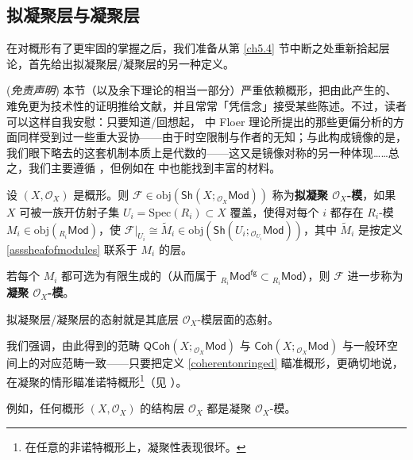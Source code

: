\subsection{拟凝聚层与凝聚层}\label{ch5.6}


在对概形有了更牢固的掌握之后，我们准备从第 \ref{ch5.4} 节中断之处重新拾起层论，首先给出拟凝聚层/凝聚层的另一种定义。

\begin{Rem}\label{disclaimer}(\textit{免责声明})
本节（以及余下理论的相当一部分）严重依赖概形，把由此产生的、难免更为技术性的证明推给文献，并且常常「凭信念」接受某些陈述。不过，读者可以这样自我安慰：只要知道/回想起，\cite{[Imp21]} 中 Floer 理论所提出的那些更偏分析的方面同样受到过一些重大妥协——由于时空限制与作者的无知；与此构成镜像的是，我们眼下略去的这套机制本质上是代数的——这又是镜像对称的另一种体现……总之，我们主要遵循 \cite{[Har77]}，但例如在 \cite[第 13 章]{[Vak17]} 中也能找到丰富的材料。 
\end{Rem}

\begin{Def}\label{quasi-/coherentmodules}
设 $(X,\mathcal{O}_X)$ 是概形。则 $\mathcal{F}\in\text{obj}(\mathsf{Sh}(X;{}_{\mathcal{O}_X}\!\mathsf{Mod}))$ 称为\textbf{拟凝聚 $\mathcal{O}_X$-模}，如果 $X$ 可被一族开仿射子集 $U_i=\text{Spec}(R_i)\subset X$ 覆盖，使得对每个 $i$ 都存在 $R_i$-模 $M_i\in\text{obj}({}_{R_i}\!\mathsf{Mod})$，使 $\mathcal{F}|_{U_i}\cong\widetilde{M}_i\in\text{obj}(\mathsf{Sh}(U_i;{}_{\mathcal{O}_{U_i}}\!\mathsf{Mod}))$，其中 $\widetilde{M}_i$ 是按定义 \ref{asssheafofmodules} 联系于 $M_i$ 的层。

若每个 $M_i$ 都可选为有限生成的（从而属于 ${}_{R_i}\!\mathsf{Mod}^\mathsf{fg}\subset {}_{R_i}\!\mathsf{Mod}$），则 $\mathcal{F}$ 进一步称为\textbf{凝聚 $\mathcal{O}_X$-模}。 

拟凝聚层/凝聚层的态射就是其底层 $\mathcal{O}_X$-模层面的态射。  
\end{Def}

我们强调，由此得到的范畴 $\mathsf{QCoh}(X;{}_{\mathcal{O}_X}\!\mathsf{Mod})$ 与 $\mathsf{Coh}(X;{}_{\mathcal{O}_X}\!\mathsf{Mod})$ 与一般环空间上的对应范畴一致——只要把定义 \ref{coherentonringed} 瞄准概形，更确切地说，在凝聚的情形瞄准诺特概形\footnote{在任意的非诺特概形上，凝聚性表现很坏。}（见 \cite[习题 II.5.4]{[Har77]}）。 

例如，任何概形 $(X,\mathcal{O}_X)$ 的结构层 $\mathcal{O}_X$ 都是凝聚 $\mathcal{O}_X$-模。

